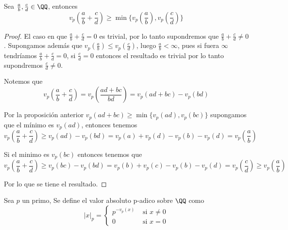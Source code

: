 \documentclass[a4paper,oneside,10.5pt]{USMArt}
\begin{document}
\begin{prop}
  Sea $\frac{a}{b}, \frac{c}{d} \in \QQ$, entonces
  \begin{equation*}
    v_{p}(\frac{a}{b} + \frac{c}{d}) \geq \min \{v_{p}(\frac{a}{b}), v_{p}(\frac{c}{d})\}
  \end{equation*}
\end{prop}
\begin{proof}
  El caso en que $\frac{a}{b} + \frac{c}{d} = 0$ es trivial, por lo tanto supondremos
  que $\frac{a}{b} + \frac{c}{d} \neq 0$. Supongamos además que $v_{p}(\frac{a}{b}) \leq v_{p}(\frac{c}{d})$,
  luego $\frac{a}{b} < \infty$, pues si fuera $\infty$ tendríamos $\frac{a}{b} + \frac{c}{d} = 0$, si $\frac{c}{d} = 0$ entonces
  el resultado es trivial por lo tanto supondremos $\frac{c}{d} \neq 0$.

  Notemos que
  \begin{equation*}
    v_{p}(\frac{a}{b} + \frac{c}{d}) = v_{p}(\frac{ad + bc}{bd}) = v_{p}(ad + bc) - v_{p}(bd)
  \end{equation*}

  Por la proposición anterior $v_{p}(ad + bc) \geq \min \{v_{p}(ad), v_{p}(bc)\}$ supongamos que el mínimo es $v_{p}(ad)$,
  entonces tenemos
  \begin{equation*}
    v_{p}(\frac{a}{b} + \frac{c}{d}) \geq v_{p}(ad) - v_{p}(bd) = v_{p}(a) + v_{p}(d) - v_{p}(b) - v_{p}(d) = v_{p}(\frac{a}{b})
  \end{equation*}

  Si el minimo es $v_{p}(bc)$ entonces tenemos que
  \begin{equation*}
    v_{p}(\frac{a}{b} + \frac{c}{d}) \geq v_{p}(bc) - v_{p}(bd) = v_{p}(b) + v_{p}(c) - v_{p}(b) -v_{p}(d) = v_{p}(\frac{c}{d}) \geq v_{p}(\frac{a}{b})
  \end{equation*}

  Por lo que se tiene el resultado.
\end{proof}

\begin{defi}
  Sea $p$ un primo, Se define el valor absoluto p-adico sobre $\QQ$ como
  \begin{equation*}
    |x|_{p} = \begin{cases}
      p^{-v_{p}(x)} & \text{ si } x \neq 0\\
      0 & \text{ si } x = 0
      \end{cases}
  \end{equation*}
\end{defi}
\end{document}
